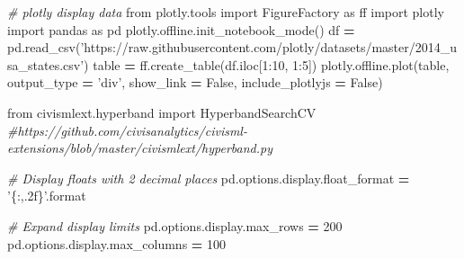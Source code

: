 \documentclass[]{book}
\newenvironment{Shaded}{\begin{snugshade}}{\end{snugshade}}
\newcommand{\DecValTok}[1]{\textcolor[rgb]{0.00,0.00,0.81}{#1}}
\newcommand{\StringTok}[1]{\textcolor[rgb]{0.31,0.60,0.02}{#1}}
\newcommand{\ImportTok}[1]{#1}
\newcommand{\CommentTok}[1]{\textcolor[rgb]{0.56,0.35,0.01}{\textit{#1}}}
\newcommand{\VariableTok}[1]{\textcolor[rgb]{0.00,0.00,0.00}{#1}}
\newcommand{\OperatorTok}[1]{\textcolor[rgb]{0.81,0.36,0.00}{\textbf{#1}}}
\newcommand{\BuiltInTok}[1]{#1}
\newcommand{\NormalTok}[1]{#1}
\theoremstyle{definition}
\theoremstyle{definition}
\theoremstyle{definition}
\theoremstyle{remark}
\begin{document}
\begin{Shaded}
\begin{Highlighting}[]
\CommentTok{# plotly display data}
\ImportTok{from}\NormalTok{ plotly.tools }\ImportTok{import}\NormalTok{ FigureFactory }\ImportTok{as}\NormalTok{ ff}
\ImportTok{import}\NormalTok{ plotly}
\ImportTok{import}\NormalTok{ pandas }\ImportTok{as}\NormalTok{ pd}
\NormalTok{plotly.offline.init_notebook_mode()}
\NormalTok{df }\OperatorTok{=}\NormalTok{ pd.read_csv(}\StringTok{'https://raw.githubusercontent.com/plotly/datasets/master/2014_usa_states.csv'}\NormalTok{)}
\NormalTok{table }\OperatorTok{=}\NormalTok{ ff.create_table(df.iloc[}\DecValTok{1}\NormalTok{:}\DecValTok{10}\NormalTok{, }\DecValTok{1}\NormalTok{:}\DecValTok{5}\NormalTok{])}
\NormalTok{plotly.offline.plot(table, output_type }\OperatorTok{=} \StringTok{'div'}\NormalTok{, show_link }\OperatorTok{=} \VariableTok{False}\NormalTok{, include_plotlyjs }\OperatorTok{=} \VariableTok{False}\NormalTok{)}
\end{Highlighting}
\end{Shaded}

\begin{Shaded}
\begin{Highlighting}[]
\ImportTok{from}\NormalTok{ civismlext.hyperband }\ImportTok{import}\NormalTok{ HyperbandSearchCV}
\CommentTok{#https://github.com/civisanalytics/civisml-extensions/blob/master/civismlext/hyperband.py}
\end{Highlighting}
\end{Shaded}

\begin{Shaded}
\begin{Highlighting}[]
\CommentTok{# Display floats with 2 decimal places}
\NormalTok{pd.options.display.float_format }\OperatorTok{=} \StringTok{'\{:,.2f\}'}\NormalTok{.}\BuiltInTok{format}
 
\CommentTok{# Expand display limits}
\NormalTok{pd.options.display.max_rows }\OperatorTok{=} \DecValTok{200}
\NormalTok{pd.options.display.max_columns }\OperatorTok{=} \DecValTok{100}
\end{Highlighting}
\end{Shaded}
\end{document}
